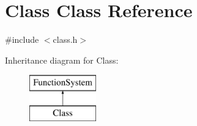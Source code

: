 \hypertarget{classClass}{}\section{Class Class Reference}
\label{classClass}


{\ttfamily \#include $<$class.\+h$>$}

Inheritance diagram for Class\+:\begin{figure}[H]
\begin{center}
\leavevmode
\includegraphics[height=2.000000cm]{classClass}
\end{center}
\end{figure}
